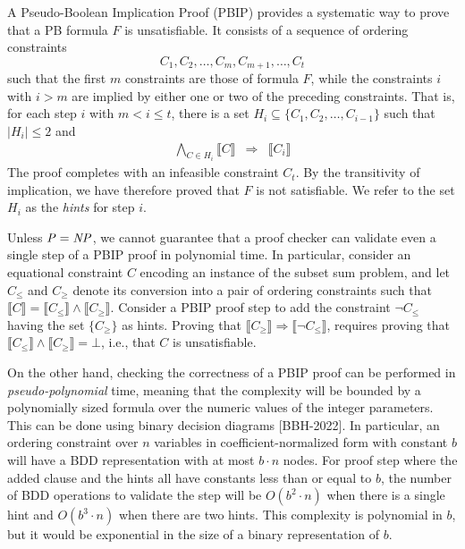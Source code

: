 \documentclass{easychair}
\newcommand{\boolnot}{\neg}
\newcommand{\nil}{\bot}
\newcommand{\imply}{\Rightarrow}
\newcommand{\func}[1]{\llbracket#1\rrbracket}
\begin{document}
A Pseudo-Boolean Implication Proof (PBIP) provides a systematic way to
prove that a PB formula $F$ is unsatisfiable.  It consists of a sequence of ordering constraints
\begin{displaymath}
  C_1, C_2, \ldots, C_m, C_{m+1}, \ldots, C_t
\end{displaymath}  
such that the first $m$ constraints are those of formula $F$, while the constraints $i$
with $i > m$ are implied by either one or two of the preceding constraints.
That is, for each step $i$ with $m < i \leq t$,
there is a set $H_i \subseteq \{C_1, C_2, \ldots, C_{i-1} \}$ such that $|H_i| \leq 2$ and
\begin{eqnarray}
\bigwedge_{C \in H_i} \func{C} & \imply & \func{C_i} \label{eqn:proofsequence}
\end{eqnarray}
The proof completes with an infeasible constraint $C_t$.
By the transitivity of implication, we have therefore proved that $F$ is not satisfiable.
We refer to the set $H_i$ as the {\em hints} for step $i$.

Unless ${\it P} = {\it NP}$, we cannot guarantee that a proof checker
can validate even a single step of a PBIP proof in polynomial time.
In particular, consider an equational constraint $C$ encoding an
instance of the subset sum problem, and let $C_{\leq}$ and $C_{\geq}$
denote its conversion into a pair of ordering constraints such that
$\func{C} = \func{C_{\leq}} \land \func{C_{\geq}}$.  Consider a PBIP
proof step to add the constraint $\boolnot C_{\leq}$ having the set
$\{ C_{\geq} \}$ as hints.  Proving that $\func{C_{\geq}} \imply
\func{\boolnot C_{\leq}}$, requires proving that $\func{C_{\leq}}
\land \func{C_{\geq}} = \nil$, i.e., that $C$ is unsatisfiable.

On the other hand, checking the correctness of a PBIP proof can be
performed in {\em pseudo-polynomial} time, meaning that the complexity will
be bounded by a polynomially sized formula over the numeric values of
the integer parameters.  This can be done using binary decision
diagrams [BBH-2022].  In particular, an ordering constraint over $n$ variables in
coefficient-normalized form with constant $b$ will have a BDD
representation with at most $b \cdot n$ nodes.  For proof step where
the added clause and the hints all have constants less than or equal
to $b$, the number of BDD operations to validate the step will be
$O(b^{2} \cdot n)$ when there is a single hint and $O(b^{3} \cdot n)$
when there are two hints.  This complexity is polynomial in $b$, but
it would be exponential in the size of a binary representation of $b$.
\end{document}
